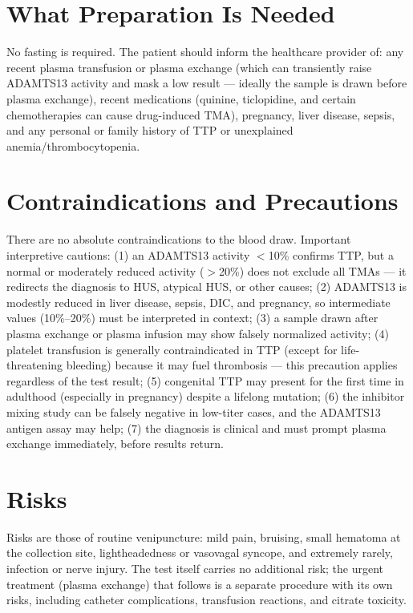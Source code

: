 \section*{What Preparation Is Needed}
No fasting is required. The patient should inform the healthcare provider of: any recent plasma transfusion or plasma exchange (which can transiently raise ADAMTS13 activity and mask a low result --- ideally the sample is drawn before plasma exchange), recent medications (quinine, ticlopidine, and certain chemotherapies can cause drug-induced TMA), pregnancy, liver disease, sepsis, and any personal or family history of TTP or unexplained anemia/thrombocytopenia.

\section*{Contraindications and Precautions}
There are no absolute contraindications to the blood draw. Important interpretive cautions: (1) an ADAMTS13 activity $<$10\% confirms TTP, but a normal or moderately reduced activity ($>$20\%) does not exclude all TMAs --- it redirects the diagnosis to HUS, atypical HUS, or other causes; (2) ADAMTS13 is modestly reduced in liver disease, sepsis, DIC, and pregnancy, so intermediate values (10\%--20\%) must be interpreted in context; (3) a sample drawn after plasma exchange or plasma infusion may show falsely normalized activity; (4) platelet transfusion is generally contraindicated in TTP (except for life-threatening bleeding) because it may fuel thrombosis --- this precaution applies regardless of the test result; (5) congenital TTP may present for the first time in adulthood (especially in pregnancy) despite a lifelong mutation; (6) the inhibitor mixing study can be falsely negative in low-titer cases, and the ADAMTS13 antigen assay may help; (7) the diagnosis is clinical and must prompt plasma exchange immediately, before results return.

\section*{Risks}
Risks are those of routine venipuncture: mild pain, bruising, small hematoma at the collection site, lightheadedness or vasovagal syncope, and extremely rarely, infection or nerve injury. The test itself carries no additional risk; the urgent treatment (plasma exchange) that follows is a separate procedure with its own risks, including catheter complications, transfusion reactions, and citrate toxicity.

